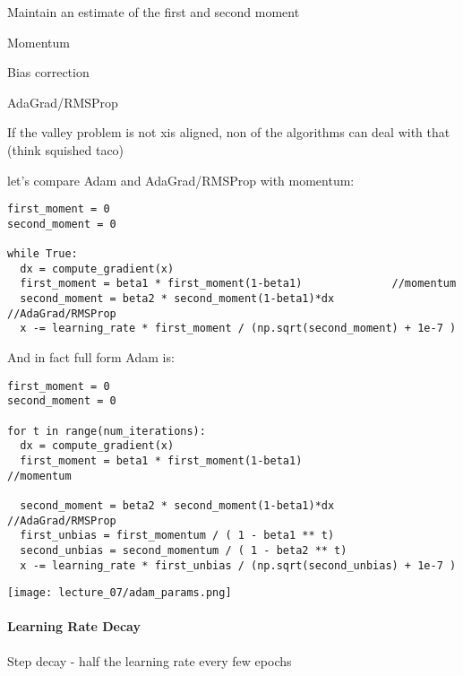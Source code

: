 Maintain an estimate of the first and second moment

Momentum

Bias correction

AdaGrad/RMSProp

If the valley problem is not xis aligned, non of the algorithms can deal with that (think squished taco)



let's compare Adam and AdaGrad/RMSProp with momentum:

\begin{verbatim}
first_moment = 0
second_moment = 0

while True:
  dx = compute_gradient(x)
  first_moment = beta1 * first_moment(1-beta1)              //momentum
  second_moment = beta2 * second_moment(1-beta1)*dx         //AdaGrad/RMSProp
  x -= learning_rate * first_moment / (np.sqrt(second_moment) + 1e-7 )  
\end{verbatim}



And in fact full form Adam is: 

\begin{verbatim}
first_moment = 0 
second_moment = 0

for t in range(num_iterations):
  dx = compute_gradient(x)
  first_moment = beta1 * first_moment(1-beta1)   						//momentum

  second_moment = beta2 * second_moment(1-beta1)*dx					//AdaGrad/RMSProp
  first_unbias = first_momentum / ( 1 - beta1 ** t)
  second_unbias = second_momentum / ( 1 - beta2 ** t)
  x -= learning_rate * first_unbias / (np.sqrt(second_unbias) + 1e-7 )
\end{verbatim}


\texttt{[image: lecture\_07/adam\_params.png]}

\paragraph{Learning Rate Decay}

Step decay - half the learning rate every few epochs

